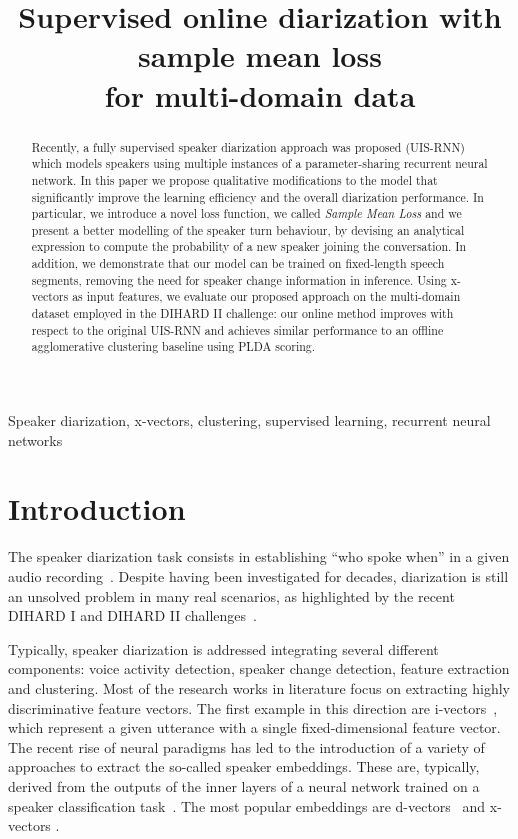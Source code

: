 \documentclass{article}
\title{Supervised online diarization with sample mean loss \\ for multi-domain data}
\begin{document}
\ninept
\maketitle
\begin{abstract}
Recently, a fully supervised speaker diarization approach was proposed (UIS-RNN) which models speakers using multiple instances of a parameter-sharing recurrent neural network. In this paper we propose qualitative modifications to the model that significantly improve the learning efficiency and the overall diarization performance. In particular, we introduce a novel loss function, we called \textit{Sample Mean Loss} and we present a better modelling of the speaker turn behaviour, by devising an analytical expression to compute the probability of a new speaker joining the conversation. In addition, we demonstrate that our model can be trained on fixed-length speech segments, removing the need for speaker change information in inference. Using x-vectors as input features, we evaluate our proposed approach on the multi-domain dataset employed in the DIHARD II challenge: our online method improves with respect to the original UIS-RNN and achieves similar performance to an offline agglomerative clustering baseline using PLDA scoring. 



\end{abstract}
\begin{keywords}
Speaker diarization, x-vectors, clustering, supervised learning, recurrent neural networks
\end{keywords}
\section{Introduction}
\label{sec:intro}
The speaker diarization task consists in establishing ``who spoke when'' in a given audio recording~\cite{tranter2006,Anguera2012overview}. Despite having been investigated for decades, diarization is still an unsolved problem in many real scenarios, as highlighted by the recent DIHARD I and DIHARD II challenges~\cite{Ryant2019}.

Typically, speaker diarization is addressed integrating several different components: voice activity detection, speaker change detection, feature extraction and clustering. Most of the research works in literature focus on extracting highly discriminative feature vectors. The first example in this direction are i-vectors~\cite{kenny2008,dehak2011}, which represent a given utterance with a single fixed-dimensional feature vector. The recent rise of neural paradigms has led to the introduction of a variety of approaches to extract the so-called speaker embeddings. These are, typically, derived from the outputs of the inner layers of a neural network trained on a speaker classification task~\cite{Nagrani18}. The most popular embeddings are d-vectors~\cite{variani2014deep} and x-vectors \cite{garcia2017speaker, Sell2018}.
\end{document}

